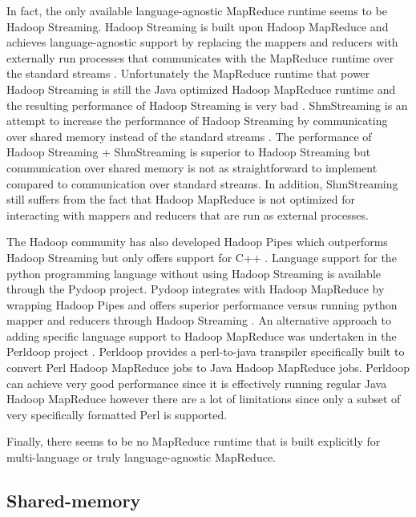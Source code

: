 \documentclass[twocolumn,11px]{article}       %
\begin{document}
In fact, the only available language-agnostic MapReduce runtime seems to be
Hadoop Streaming. Hadoop Streaming is built upon Hadoop MapReduce and achieves
language-agnostic support by replacing the mappers and reducers with externally
run processes that communicates with the MapReduce runtime over the standard
streams \cite{HadoopStreaming}. Unfortunately the MapReduce runtime that power
Hadoop Streaming is still the Java optimized Hadoop MapReduce runtime and the
resulting performance of Hadoop Streaming is very bad \cite{HadoopStreamingPerf}
\cite{Pydoop} \cite{Perldoop}. ShmStreaming is an attempt to increase the
performance of Hadoop Streaming by communicating over shared memory instead of
the standard streams \cite{ShmStreaming}. The performance of Hadoop Streaming +
ShmStreaming is superior to Hadoop Streaming but communication over shared
memory is not as straightforward to implement compared to communication over
standard streams. In addition, ShmStreaming still suffers from the fact that
Hadoop MapReduce is not optimized for interacting with mappers and reducers that
are run as external processes.

The Hadoop community has also developed Hadoop Pipes which outperforms Hadoop
Streaming but only offers support for C++ \cite{HadoopPipes}. Language support
for the python programming language without using Hadoop Streaming is available
through the Pydoop project. Pydoop integrates with Hadoop MapReduce by wrapping
Hadoop Pipes and offers superior performance versus running python mapper and
reducers through Hadoop Streaming \cite{Pydoop}. An alternative approach to
adding specific language support to Hadoop MapReduce was undertaken in the
Perldoop project \cite{Perldoop}. Perldoop provides a perl-to-java transpiler
specifically built to convert Perl Hadoop MapReduce jobs to Java Hadoop
MapReduce jobs. Perldoop can achieve very good performance since it is
effectively running regular Java Hadoop MapReduce however there are a lot of
limitations since only a subset of very specifically formatted Perl is
supported.

Finally, there seems to be no MapReduce runtime that is built explicitly for
multi-language or truly language-agnostic MapReduce.



\subsection{Shared-memory}
\end{document}
